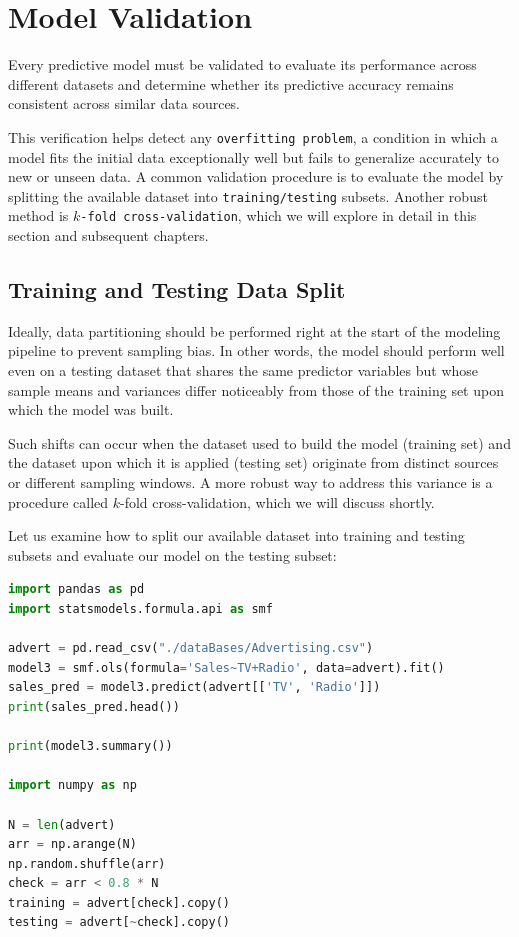 \section{Model Validation}

Every predictive model must be validated to evaluate its performance across different datasets and determine whether its predictive accuracy remains consistent across similar data sources.

This verification helps detect any \texttt{overfitting problem}, a condition in which a model fits the initial data exceptionally well but fails to generalize accurately to new or unseen data. A common validation procedure is to evaluate the model by splitting the available dataset into \texttt{training/testing} subsets. Another robust method is \texttt{$k$-fold cross-validation}, which we will explore in detail in this section and subsequent chapters.

\subsection{Training and Testing Data Split}

Ideally, data partitioning should be performed right at the start of the modeling pipeline to prevent sampling bias. In other words, the model should perform well even on a testing dataset that shares the same predictor variables but whose sample means and variances differ noticeably from those of the training set upon which the model was built.

Such shifts can occur when the dataset used to build the model (training set) and the dataset upon which it is applied (testing set) originate from distinct sources or different sampling windows. A more robust way to address this variance is a procedure called $k$-fold cross-validation, which we will discuss shortly.

Let us examine how to split our available dataset into training and testing subsets and evaluate our model on the testing subset:

\begin{lstlisting}[language=Python]
import pandas as pd
import statsmodels.formula.api as smf

advert = pd.read_csv("./dataBases/Advertising.csv")
model3 = smf.ols(formula='Sales~TV+Radio', data=advert).fit()
sales_pred = model3.predict(advert[['TV', 'Radio']])
print(sales_pred.head())

print(model3.summary())

import numpy as np

N = len(advert)
arr = np.arange(N)
np.random.shuffle(arr)
check = arr < 0.8 * N
training = advert[check].copy()
testing = advert[~check].copy()
\end{lstlisting}

